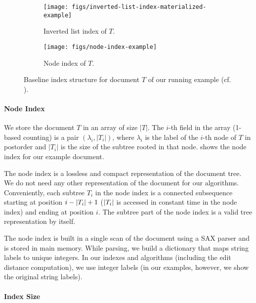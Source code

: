 \begin{figure}[ht]
  \centering
  \begin{subfigure}[b]{0.475\textwidth}
    \centering
    \texttt{[image: figs/inverted-list-index-materialized-example]}
    \caption{Inverted list index of $T$.}
    \label{fig:inverted-list-index-materialized-example}
  \end{subfigure}
  \begin{subfigure}[b]{0.475\textwidth}
    \centering
    \texttt{[image: figs/node-index-example]}
    \caption{Node index of $T$.}
    \label{fig:node-index-example}
  \end{subfigure}
  \caption{Baseline index structure for document $T$ of our running example (cf. ).}
  \label{fig:baseline-index-structure}
\end{figure}

\paragraph{Node Index}

We store the document $T$ in an array of size $|T|$. The $i$-th field in the array (1-based counting) is a pair $(\lambda_i, |T_i|)$, where $\lambda_i$ is the label of the $i$-th node of $T$ in postorder and $|T_i|$ is the size of the subtree rooted in that node.  shows the node index for our example document.

The node index is a lossless and compact representation of the document tree. We do not need any other representation of the document for our algorithms.
Conveniently, each subtree $T_i$ in the node index is a connected subsequence starting at position $i - \left| T_i \right| + 1$ ($\left| T_i \right|$ is accessed in constant time in the node index) and ending at position $i$. The subtree part of the node index is a valid tree representation by itself.

The node index is built in a single scan of the document using a SAX parser and is stored in main memory. While parsing, we build a dictionary that maps string labels to unique integers. In our indexes and algorithms (including the edit distance computation), we use integer labels (in our examples, however, we show the original string labels).

\paragraph{Index Size}

